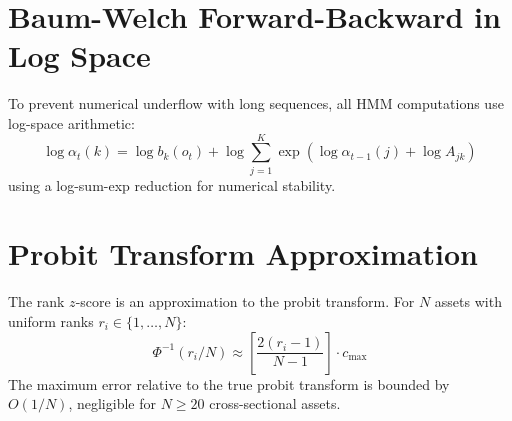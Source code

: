\documentclass[11pt]{article}
\begin{document}
\section{Baum-Welch Forward-Backward in Log Space}

To prevent numerical underflow with long sequences, all HMM computations use log-space arithmetic:
\begin{equation}
\log \alpha_t(k) = \log b_k(o_t) + \log \sum_{j=1}^{K} \exp\left(\log \alpha_{t-1}(j) + \log A_{jk}\right)
\label{eq:log-forward}
\end{equation}
using a log-sum-exp reduction for numerical stability.

\section{Probit Transform Approximation}

The rank $z$-score is an approximation to the probit transform. For $N$ assets with uniform ranks $r_i \in \{1, \ldots, N\}$:
\begin{equation}
\Phi^{-1}(r_i/N) \approx \left[\frac{2(r_i-1)}{N-1}\right] \cdot c_{\max}
\label{eq:probit-approx}
\end{equation}
The maximum error relative to the true probit transform is bounded by $O(1/N)$, negligible for $N \geq 20$ cross-sectional assets.
\end{document}
